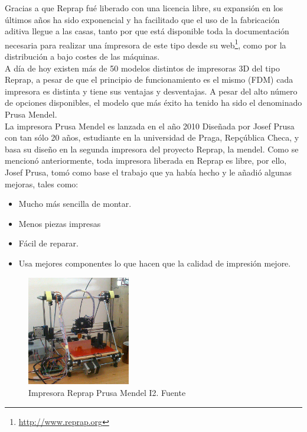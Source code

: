 Gracias a que Reprap fué liberado con una licencia libre, su expansión en los últimos años ha sido exponencial y ha facilitado que el uso de la fabricación aditiva llegue a las casas, tanto por que está disponible toda la documentación necesaria para realizar una ímpresora de este tipo desde su web\footnote{\url{http://www.reprap.org}}, como por la distribución a bajo costes de las máquinas.\\

A día de hoy existen más de 50 modelos distintos de impresoras 3D del tipo Reprap, a pesar de que el principio de funcionamiento es el mismo (FDM) cada impresora es distinta y tiene sus ventajas y desventajas. A pesar del alto número de opciones disponibles, el modelo que más éxito ha tenido ha sido el denominado Prusa Mendel.\\

La impresora Prusa Mendel es lanzada en el año 2010 Diseñada por Josef Prusa con tan sólo 20 años, estudiante en la universidad de Praga, Repçública Checa, y basa su diseño
en la segunda impresora del proyecto Reprap, la mendel. Como se mencionó anteriormente, toda impresora liberada en Reprap es libre, por ello, Josef Prusa, tomó como base el trabajo que ya había hecho y le añadió algunas mejoras, tales como:
\begin{itemize}
    \item Mucho más sencilla de montar.
    \item Menos piezas impresas
    \item Fácil de reparar.
    \item Usa mejores componentes lo que hacen que la calidad de impresión mejore.
\end{itemize}

\begin{figure}[H]
        \centering
        \includegraphics[width=0.4\textwidth]{images/prusa_i2.jpg}
        \caption{Impresora Reprap Prusa Mendel I2. Fuente \cite{prusai2}}
        \label{fig:estado_i2}
\end{figure}

